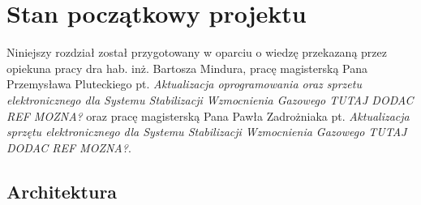 
\chapter{Stan początkowy projektu}
\label{cha:pocz}

Niniejszy rozdział został przygotowany w oparciu o wiedzę przekazaną przez opiekuna pracy dra hab. inż. Bartosza Mindura, pracę magisterską Pana Przemysława Pluteckiego pt. \textit{Aktualizacja oprogramowania oraz sprzetu elektronicznego dla Systemu Stabilizacji Wzmocnienia Gazowego TUTAJ DODAC REF MOZNA?} oraz pracę magisterską Pana Pawła Zadrożniaka pt. \textit{Aktualizacja sprzętu elektronicznego dla Systemu Stabilizacji Wzmocnienia Gazowego TUTAJ DODAC REF MOZNA?}.

\section{Architektura}


